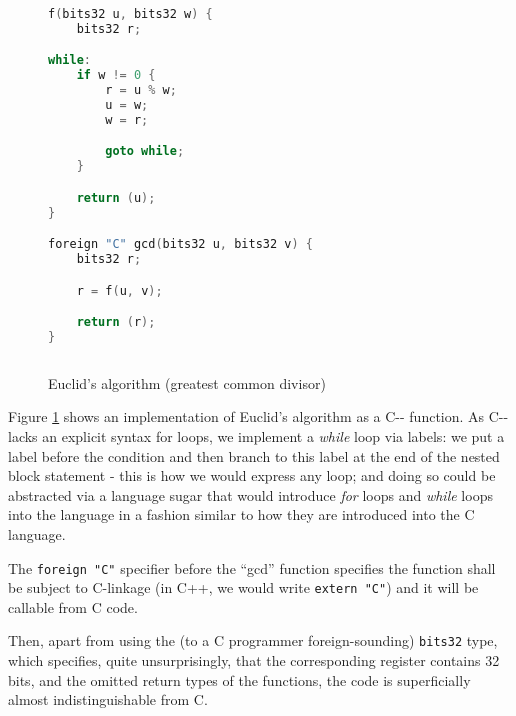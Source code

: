 \documentclass[12pt,a4paper]{article}
\begin{document}
\pagebreak

\begin{figure}[!h]
	\caption{Euclid's algorithm (greatest common divisor)}
	\label{Cmm-figure}
	\begin{lstlisting}[language=C]
f(bits32 u, bits32 w) {
	bits32 r;

while:
	if w != 0 {
		r = u % w;
		u = w;
		w = r;

		goto while;
	}

	return (u);
}

foreign "C" gcd(bits32 u, bits32 v) {
	bits32 r;

	r = f(u, v);

	return (r);
}
		
	\end{lstlisting}
\end{figure}

Figure \ref{Cmm-figure} shows an implementation of Euclid's algorithm as a C-{}- function. As C-{}- lacks an explicit syntax for loops, we implement a \textit{while} loop via labels: we put a label before the condition and then branch to this label at the end of the nested block statement - this is how we would express any loop; and doing so could be abstracted via a language sugar that would introduce \textit{for} loops and \textit{while} loops into the language in a fashion similar to how they are introduced into the C language. 

The \lstinline{foreign "C"} specifier before the ``gcd'' function specifies the function shall be subject to C-linkage (in C++, we would write \lstinline{extern "C"}) and it will be callable from C code.

Then, apart from using the (to a C programmer foreign-sounding) \lstinline{bits32} type, which specifies, quite unsurprisingly, that the corresponding register contains 32 bits, and the omitted return types of the functions, the code is superficially almost indistinguishable from C.
\end{document}
